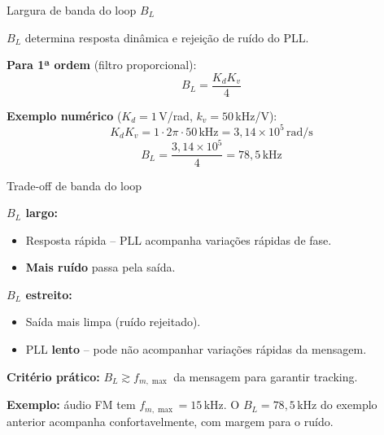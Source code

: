 
\begin{frame}{Largura de banda do loop $B_L$}

\textbf{$B_L$} determina resposta dinâmica e rejeição de ruído do PLL.

\vspace{0.3cm}
\textbf{Para 1ª ordem} (filtro proporcional):
\[
\boxed{\;B_L = \frac{K_d K_v}{4}\;}
\]

\pause
\vspace{0.3cm}
\textbf{Exemplo numérico} ($K_d = 1$\,V/rad, $k_v = 50$\,kHz/V):
\[
K_d K_v = 1 \cdot 2\pi \cdot 50\,\text{kHz} = 3{,}14\!\times\!10^5\,\text{rad/s}
\]
\[
B_L = \frac{3{,}14\!\times\!10^5}{4} = 78{,}5\,\text{kHz}
\]

\end{frame}


\begin{frame}{Trade-off de banda do loop}

\textbf{$B_L$ largo:}
\begin{itemize}\itemsep0pt
\item Resposta rápida -- PLL acompanha variações rápidas de fase.
\item \textbf{Mais ruído} passa pela saída.
\end{itemize}

\pause
\vspace{0.3cm}
\textbf{$B_L$ estreito:}
\begin{itemize}\itemsep0pt
\item Saída mais limpa (ruído rejeitado).
\item PLL \textbf{lento} -- pode não acompanhar variações rápidas da mensagem.
\end{itemize}

\pause
\vspace{0.3cm}
\textbf{Critério prático:} $B_L \gtrsim f_{m,\max}$ da mensagem para garantir tracking.

\textbf{Exemplo:} áudio FM tem $f_{m,\max} = 15$\,kHz. O $B_L = 78{,}5$\,kHz do exemplo anterior acompanha confortavelmente, com margem para o ruído.

\end{frame}


